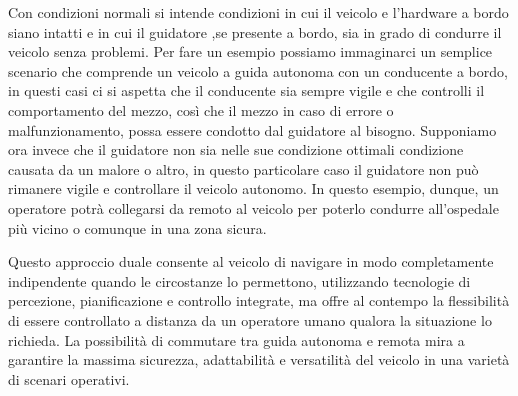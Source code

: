 \noindent Con condizioni normali si intende condizioni in cui il veicolo e l'hardware a bordo siano intatti e in cui il guidatore ,se presente a bordo, sia in grado di condurre il veicolo senza problemi. Per fare un esempio possiamo immaginarci un semplice scenario che comprende un veicolo a guida autonoma con un conducente a bordo, in questi casi ci si aspetta che il conducente sia sempre vigile e che controlli il comportamento del mezzo, così che il mezzo in caso di errore o malfunzionamento, possa essere condotto dal guidatore al bisogno. Supponiamo ora invece che il guidatore non sia nelle sue condizione ottimali condizione causata da un malore o altro, in questo particolare caso il guidatore non può rimanere vigile e controllare il veicolo autonomo. In questo esempio, dunque, un operatore potrà collegarsi da remoto al veicolo per poterlo condurre all'ospedale più vicino o comunque in una zona sicura.

\noindent Questo approccio duale consente al veicolo di navigare in modo completamente indipendente quando le circostanze lo permettono, utilizzando tecnologie di percezione, pianificazione e controllo integrate, ma offre al contempo la flessibilità di essere controllato a distanza da un operatore umano qualora la situazione lo richieda. La possibilità di commutare tra guida autonoma e remota mira a garantire la massima sicurezza, adattabilità e versatilità del veicolo in una varietà di scenari operativi.

